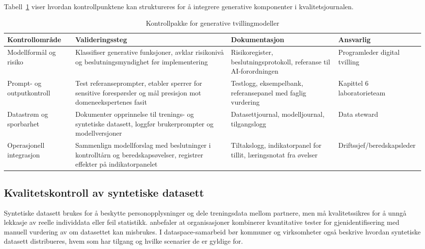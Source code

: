 Tabell~\ref{tab:generativ-validering} viser hvordan kontrollpunktene kan struktureres for å integrere generative komponenter i kvalitetsjournalen.

\begin{table}[ht]
    \centering
    \caption{Kontrollpakke for generative tvillingmodeller}
    \label{tab:generativ-validering}
    \begin{tabular}{|p{3.2cm}|p{4.6cm}|p{4.6cm}|p{3.0cm}|}
        \hline
        \textbf{Kontrollområde} & \textbf{Valideringssteg} & \textbf{Dokumentasjon} & \textbf{Ansvarlig} \\
        \hline
        Modellformål og risiko & Klassifiser generative funksjoner, avklar risikonivå og beslutningsmyndighet før implementering & Risikoregister, beslutningsprotokoll, referanse til AI-forordningen \citep{eu2024aiact} & Programleder digital tvilling \\
        \hline
        Prompt- og outputkontroll & Test referanseprompter, etabler sperrer for sensitive forespørsler og mål presisjon mot domeneekspertenes fasit & Testlogg, eksempelbank, referansepanel med faglig vurdering & Kapittel 6 laboratorieteam \\
        \hline
        Datastrøm og sporbarhet & Dokumenter opprinnelse til trenings- og syntetiske datasett, loggfør brukerprompter og modellversjoner & Datasettjournal, modelljournal, tilgangslogg \citep{digdir2024datasamarbeid} & Data steward \\
        \hline
        Operasjonell integrasjon & Sammenlign modellforslag med beslutninger i kontrolltårn og beredskapsøvelser, registrer effekter på indikatorpanelet & Tiltakslogg, indikatorpanel for tillit, læringsnotat fra øvelser & Driftssjef/beredskapsleder \\
        \hline
    \end{tabular}
\end{table}

\subsection{Kvalitetskontroll av syntetiske datasett}
Syntetiske datasett brukes for å beskytte personopplysninger og dele treningsdata mellom partnere, men må kvalitetssikres for å unngå lekkasje av reelle individdata eller feil statistikk. \citet{datatilsynet2022anonymisering} anbefaler at organisasjoner kombinerer kvantitative tester for gjenidentifisering med manuell vurdering av om datasettet kan misbrukes. I dataspace-samarbeid bør kommuner og virksomheter også beskrive hvordan syntetiske datasett distribueres, hvem som har tilgang og hvilke scenarier de er gyldige for.\citep{digdir2024datasamarbeid}

